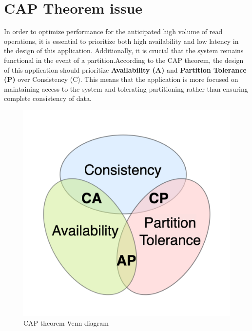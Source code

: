 \chapter{CAP Theorem issue}

In order to optimize performance for the anticipated high volume of read operations, it is essential to prioritize both high availability and low latency in the design of this application. Additionally, it is crucial that the system remains functional in the event of a partition.According to the CAP theorem, the design of this application should prioritize \textbf{Availability (A)} and \textbf{Partition Tolerance (P)} over Consistency (C). This means that the application is more focused on maintaining access to the system and tolerating partitioning rather than ensuring complete consistency of data.
\begin{figure}[H]
	\centering
	\includegraphics[width=0.4\linewidth]{assets/CAP_Theorem_Venn_Diagram}
	\caption{CAP theorem Venn diagram}
	\label{fig:captheoremvenndiagram}
\end{figure}